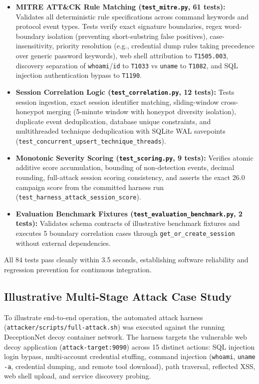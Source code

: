 \documentclass[12pt,a4paper]{report}
\begin{document}
\begin{itemize}
\item \textbf{MITRE ATT\&CK Rule Matching (\texttt{test\_mitre.py}, 61 tests):} Validates all deterministic rule specifications across command keywords and protocol event types. Tests verify exact signature boundaries, regex word-boundary isolation (preventing short-substring false positives), case-insensitivity, priority resolution (e.g., credential dump rules taking precedence over generic password keywords), web shell attribution to \texttt{T1505.003}, discovery separation of \texttt{whoami}/\texttt{id} to \texttt{T1033} vs \texttt{uname} to \texttt{T1082}, and SQL injection authentication bypass to \texttt{T1190}.
\item \textbf{Session Correlation Logic (\texttt{test\_correlation.py}, 12 tests):} Tests session ingestion, exact session identifier matching, sliding-window cross-honeypot merging (5-minute window with honeypot diversity isolation), duplicate event deduplication, database unique constraints, and multithreaded technique deduplication with SQLite WAL savepoints (\texttt{test\_concurrent\_upsert\_technique\_threads}).
\item \textbf{Monotonic Severity Scoring (\texttt{test\_scoring.py}, 9 tests):} Verifies atomic additive score accumulation, bounding of non-detection events, decimal rounding, full-attack session scoring consistency, and asserts the exact 26.0 campaign score from the committed harness run (\texttt{test\_harness\_attack_session_score}).
\item \textbf{Evaluation Benchmark Fixtures (\texttt{test\_evaluation\_benchmark.py}, 2 tests):} Validates schema contracts of illustrative benchmark fixtures and executes 5 boundary correlation cases through \texttt{get\_or_create_session} without external dependencies.
\end{itemize}

All 84 tests pass cleanly within 3.5 seconds, establishing software reliability and regression prevention for continuous integration.

\subsection{Illustrative Multi-Stage Attack Case Study}

To illustrate end-to-end operation, the automated attack harness (\texttt{attacker/scripts/full-attack.sh}) was executed against the running DeceptionNet decoy container network. The harness targets the vulnerable web decoy application (\texttt{attack-target:9090}) across 15 distinct actions: SQL injection login bypass, multi-account credential stuffing, command injection (\texttt{whoami}, \texttt{uname -a}, credential dumping, and remote tool download), path traversal, reflected XSS, web shell upload, and service discovery probing.
\end{document}
